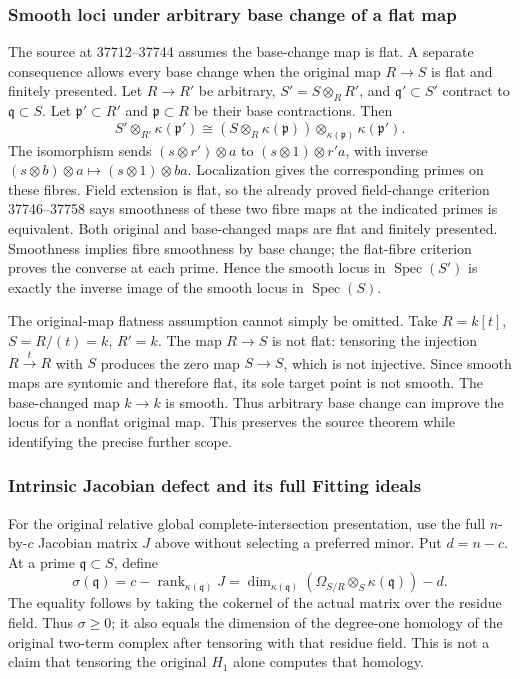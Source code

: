 \subsubsection{Smooth loci under arbitrary base change of a flat map}\label{algebra-proof-047-smooth-loci-under-arbitrary-base-change-of-a-flat-map}

The source at 37712--37744 assumes the base-change map is flat. A separate consequence allows every base change when the original map \(R\to S\) is flat and finitely presented. Let \(R\to R'\) be arbitrary, \(S'=S\otimes_RR'\), and \(\mathfrak q'\subset S'\) contract to \(\mathfrak q\subset S\). Let \(\mathfrak p'\subset R'\) and \(\mathfrak p\subset R\) be their base contractions. Then \[
S'\otimes_{R'}\kappa(\mathfrak p')
\cong
(S\otimes_R\kappa(\mathfrak p))\otimes_{\kappa(\mathfrak p)}\kappa(\mathfrak p').
\] The isomorphism sends \((s\otimes r')\otimes a\) to \((s\otimes1)\otimes r'a\), with inverse \((s\otimes b)\otimes a\mapsto(s\otimes1)\otimes ba\). Localization gives the corresponding primes on these fibres. Field extension is flat, so the already proved field-change criterion 37746--37758 says smoothness of these two fibre maps at the indicated primes is equivalent. Both original and base-changed maps are flat and finitely presented. Smoothness implies fibre smoothness by base change; the flat-fibre criterion proves the converse at each prime. Hence the smooth locus in \(\operatorname{Spec}(S')\) is exactly the inverse image of the smooth locus in \(\operatorname{Spec}(S)\).

The original-map flatness assumption cannot simply be omitted. Take \(R=k[t]\), \(S=R/(t)=k\), \(R'=k\). The map \(R\to S\) is not flat: tensoring the injection \(R\xrightarrow{t}R\) with \(S\) produces the zero map \(S\to S\), which is not injective. Since smooth maps are syntomic and therefore flat, its sole target point is not smooth. The base-changed map \(k\to k\) is smooth. Thus arbitrary base change can improve the locus for a nonflat original map. This preserves the source theorem while identifying the precise further scope.

\subsubsection{Intrinsic Jacobian defect and its full Fitting ideals}\label{algebra-proof-047-intrinsic-jacobian-defect-and-its-full-fitting-ideals}

For the original relative global complete-intersection presentation, use the full \(n\)-by-\(c\) Jacobian matrix \(J\) above without selecting a preferred minor. Put \(d=n-c\). At a prime \(\mathfrak q\subset S\), define \[
\sigma(\mathfrak q)=c-\operatorname{rank}_{\kappa(\mathfrak q)}J
=\dim_{\kappa(\mathfrak q)}(\Omega_{S/R}\otimes_S\kappa(\mathfrak q))-d.
\] The equality follows by taking the cokernel of the actual matrix over the residue field. Thus \(\sigma\ge0\); it also equals the dimension of the degree-one homology of the original two-term complex after tensoring with that residue field. This is not a claim that tensoring the original \(H_1\) alone computes that homology.

